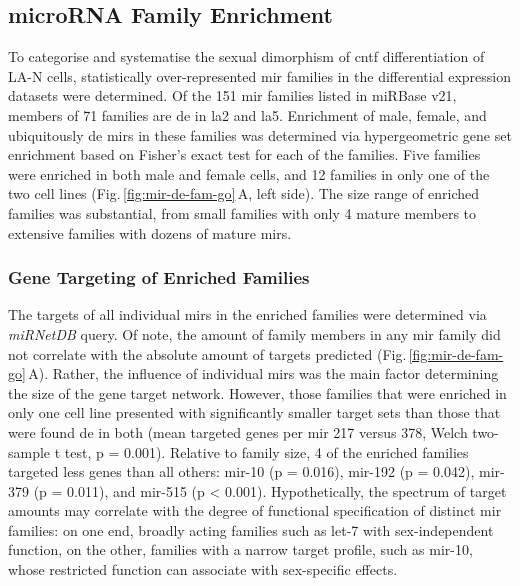\subsection{microRNA Family Enrichment}
To categorise and systematise the sexual dimorphism of \ac{cntf} differentiation of LA-N cells, statistically over-represented \ac{mir} families in the differential expression datasets were determined. Of the 151 \ac{mir} families listed in miRBase v21, members of 71 families are \ac{de} in \ac{la2} and \ac{la5}. Enrichment of male, female, and ubiquitously \ac{de} \acp{mir} in these families was determined via hypergeometric gene set enrichment based on Fisher's exact test for each of the families. Five families were enriched in both male and female cells, and 12 families in only one of the two cell lines (Fig.\,\ref{fig:mir-de-fam-go}\,A, left side). The size range of enriched families was substantial, from small families with only 4 mature members to extensive families with dozens of mature \acp{mir}. 

\subsubsection{Gene Targeting of Enriched Families}
The targets of all individual \acp{mir} in the enriched families were determined via \textit{miRNetDB} query. Of note, the amount of family members in any \ac{mir} family did not correlate with the absolute amount of targets predicted (Fig.\,\ref{fig:mir-de-fam-go}\,A). Rather, the influence of individual \acp{mir} was the main factor determining the size of the gene target network. However, those families that were enriched in only one cell line presented with significantly smaller target sets than those that were found \ac{de} in both (mean targeted genes per \ac{mir} 217 versus 378, Welch two-sample t test, p = 0.001). Relative to family size, 4 of the enriched families targeted less genes than all others: mir-10 (p = 0.016), mir-192 (p = 0.042), mir-379 (p = 0.011), and mir-515 (p < 0.001). Hypothetically, the spectrum of target amounts may correlate with the degree of functional specification of distinct \ac{mir} families: on one end, broadly acting families such as let-7 with sex-independent function, on the other, families with a narrow target profile, such as mir-10, whose restricted function can associate with sex-specific effects.

